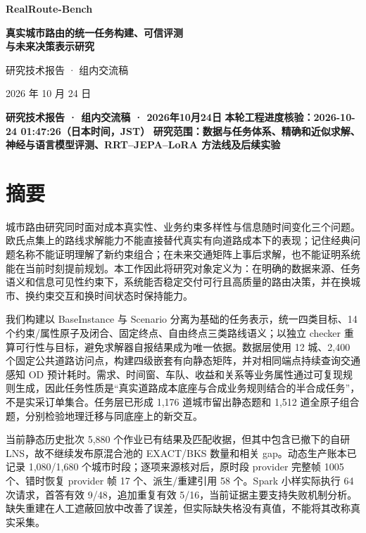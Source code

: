 \documentclass[UTF8,10pt,a4paper,fontset=fandol]{ctexart}
\begin{document}
\begin{center}{\LARGE\bfseries\color{ink}RealRoute-Bench\par}\vspace{5mm}

{\Large\bfseries 真实城市路由的统一任务构建、可信评测\\与未来决策表示研究\par}\vspace{5mm}

{\large 研究技术报告 · 组内交流稿\par}\vspace{2mm}

2026 年 10 月 24 日\end{center}\vspace{3mm}

\textbf{研究技术报告 · 组内交流稿 · 2026年10月24日} \textbf{本轮工程进度核验：2026-10-24 01:47:26（日本时间，JST）} \textbf{研究范围：数据与任务体系、精确和近似求解、神经与语言模型评测、RRT–JEPA–LoRA 方法线及后续实验}


\section*{摘要}


城市路由研究同时面对成本真实性、业务约束多样性与信息随时间变化三个问题。欧氏点集上的路线求解能力不能直接替代真实有向道路成本下的表现；记住经典问题名称不能证明理解了新约束组合；在未来交通矩阵上事后求解，也不能证明系统能在当前时刻提前规划。本工作因此将研究对象定义为：在明确的数据来源、任务语义和信息可见性约束下，系统能否稳定交付可行且高质量的路由决策，并在换城市、换约束交互和换时间状态时保持能力。


我们构建以 BaseInstance 与 Scenario 分离为基础的任务表示，统一四类目标、14 个约束/\allowbreak{}属性原子及闭合、固定终点、自由终点三类路线语义；以独立 checker 重算可行性与目标，避免求解器自报结果成为唯一依据。数据层使用 12 城、2,400 个固定公共道路访问点，构建四级嵌套有向静态矩阵，并对相同端点持续查询交通感知 OD 预计耗时。需求、时间窗、车队、收益和关系等业务属性通过可复现规则生成，因此任务性质是“真实道路成本底座与合成业务规则结合的半合成任务”，不是实采订单集合。任务层已形成 1,176 道城市留出静态题和 1,512 道全原子组合题，分别检验地理迁移与同底座上的新交互。


当前静态历史批次 5,880 个作业已有结果及匹配收据，但其中包含已撤下的自研 LNS，故不继续发布原混合池的 EXACT/\allowbreak{}BKS 数量和相关 gap。动态生产账本已记录 1,080/\allowbreak{}1,680 个城市时段；逐项来源核对后，原时段 provider 完整帧 1005 个、错时恢复 provider 帧 17 个、派生/\allowbreak{}重建引用 58 个。Spark 小样实际执行 64 次请求，首答有效 9/\allowbreak{}48，追加重复有效 5/\allowbreak{}16，当前证据主要支持失败机制分析。缺失重建在人工遮蔽回放中改善了误差，但实际缺失格没有真值，不能将其改称真实采集。
\end{document}
